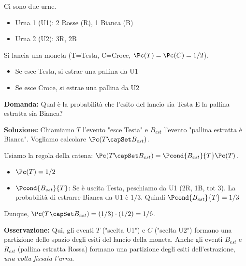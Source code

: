 \begin{example}
Ci sono due urne. 
\begin{itemize}
    \item Urna 1 (U1): 2 Rosse (R), 1 Bianca (B)
    \item Urna 2 (U2): 3R, 2B
\end{itemize}

Si lancia una moneta (T=Testa, C=Croce, $\Pc(T)=\Pc(C)=1/2$).
\begin{itemize}
    \item Se esce Testa, si estrae una pallina da U1
    \item Se esce Croce, si estrae una pallina da U2
\end{itemize}

\textbf{Domanda:} Qual è la probabilità che l'esito del lancio sia Testa E la pallina estratta sia Bianca?

\textbf{Soluzione:}
Chiamiamo $T$ l'evento "esce Testa" e $B_{est}$ l'evento "pallina estratta è Bianca". 
Vogliamo calcolare $\Pc(T \capSet B_{est})$.

Usiamo la regola della catena: $\Pc(T \capSet B_{est}) = \Pcond{B_{est}}{T} \Pc(T)$.
\begin{itemize}
    \item $\Pc(T) = 1/2$
    \item $\Pcond{B_{est}}{T}$: Se è uscita Testa, peschiamo da U1 (2R, 1B, tot 3). 
    La probabilità di estrarre Bianca da U1 è $1/3$. 
    Quindi $\Pcond{B_{est}}{T} = 1/3$
\end{itemize}

Dunque, $\Pc(T \capSet B_{est}) = (1/3) \cdot (1/2) = 1/6$.

\textbf{Osservazione:} Qui, gli eventi $T$ ("scelta U1") e $C$ ("scelta U2") formano una partizione dello spazio degli esiti del lancio della moneta. Anche gli eventi $B_{est}$ e $R_{est}$ (pallina estratta Rossa) formano una partizione degli esiti dell'estrazione, \textit{una volta fissata l'urna}.
\end{example}

